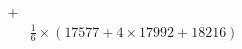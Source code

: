 \documentclass[preview]{standalone}
\begin{document}
\begin{align*}
+&\\&\frac{1}{6}\times(17577+4\times17992+18216)
\end{align*}
\end{document}
